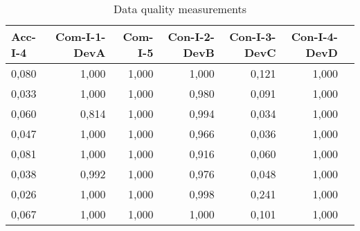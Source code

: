 \begin{table}[t]
\caption{Data quality measurements}
\label{tab:dataquality}
\begin{tabular}{|p{2cm}|r|r|r|r|r|r|}
\hline
Acc-I-4 & Com-I-1-DevA & Com-I-5 & Con-I-2-DevB & Con-I-3-DevC & Con-I-4-DevD \\
\hline
0,080\cellcolor[HTML]{FEF6F3}& 1,000\cellcolor[HTML]{FFFFFF}& 1,000\cellcolor[HTML]{FFFFFF}& 1,000\cellcolor[HTML]{FFFFFF}& 0,121\cellcolor[HTML]{FEF1ED}& 1,000\cellcolor[HTML]{FFFFFF}\\
0,033\cellcolor[HTML]{FEFBFA}& 1,000\cellcolor[HTML]{FFFFFF}& 1,000\cellcolor[HTML]{FFFFFF}& 0,980\cellcolor[HTML]{FEFCFC}& 0,091\cellcolor[HTML]{FEF5F2}& 1,000\cellcolor[HTML]{FFFFFF}\\
0,060\cellcolor[HTML]{FEF8F6}& 0,814\cellcolor[HTML]{FEEAE4}& 1,000\cellcolor[HTML]{FFFFFF}& 0,994\cellcolor[HTML]{FEFEFE}& 0,034\cellcolor[HTML]{FEFBFA}& 1,000\cellcolor[HTML]{FFFFFF}\\
0,047\cellcolor[HTML]{FEF9F8}& 1,000\cellcolor[HTML]{FFFFFF}& 1,000\cellcolor[HTML]{FFFFFF}& 0,966\cellcolor[HTML]{FEFBFA}& 0,036\cellcolor[HTML]{FEFBF9}& 1,000\cellcolor[HTML]{FFFFFF}\\
0,081\cellcolor[HTML]{FEF6F3}& 1,000\cellcolor[HTML]{FFFFFF}& 1,000\cellcolor[HTML]{FFFFFF}& 0,916\cellcolor[HTML]{FEF5F3}& 0,060\cellcolor[HTML]{FEF8F6}& 1,000\cellcolor[HTML]{FFFFFF}\\
0,038\cellcolor[HTML]{FEFAF9}& 0,992\cellcolor[HTML]{FEFEFD}& 1,000\cellcolor[HTML]{FFFFFF}& 0,976\cellcolor[HTML]{FEFCFB}& 0,048\cellcolor[HTML]{FEF9F8}& 1,000\cellcolor[HTML]{FFFFFF}\\
0,026\cellcolor[HTML]{FEFCFB}& 1,000\cellcolor[HTML]{FFFFFF}& 1,000\cellcolor[HTML]{FFFFFF}& 0,998\cellcolor[HTML]{FEFEFE}& 0,241\cellcolor[HTML]{FEE4DD}& 1,000\cellcolor[HTML]{FFFFFF}\\
0,067\cellcolor[HTML]{FEF7F5}& 1,000\cellcolor[HTML]{FFFFFF}& 1,000\cellcolor[HTML]{FFFFFF}& 1,000\cellcolor[HTML]{FFFFFF}& 0,101\cellcolor[HTML]{FEF3F0}& 1,000\cellcolor[HTML]{FFFFFF}\\
\hline
\end{tabular}
\end{table}
